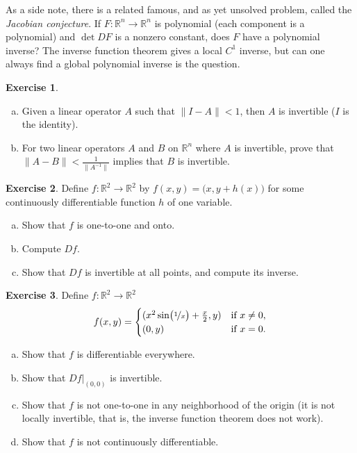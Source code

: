 \documentclass[12pt,openany]{book}
\newcommand{\snorm}[1]{\lVert {#1} \rVert}
\newcommand{\R}{{\mathbb{R}}}
\newcommand{\myindex}[1]{#1\index{#1}}
\theoremstyle{plain}
\theoremstyle{remark}
\theoremstyle{definition}
\newenvironment{exbox}{%
    \def\FrameCommand{\vrule width 1pt \relax\hspace {10pt}}%
    \MakeFramed {\advance \hsize -\width \FrameRestore }%
}{%
    \endMakeFramed
}
\newenvironment{exparts}{%
    \leavevmode\begin{enumerate}[a),noitemsep,topsep=0pt,parsep=0pt,partopsep=0pt]
}{%
    \end{enumerate}
}
\theoremstyle{exercise}
\newtheorem{exercise}{Exercise}[section]
\theoremstyle{example}
\begin{document}
\medskip

As a side note, there is a related famous, and as yet unsolved problem,
called the \emph{\myindex{Jacobian conjecture}}.  If $F \colon \R^n \to
\R^n$ is polynomial (each component is a polynomial) and $\det DF$ is a nonzero
constant, does $F$ have a polynomial inverse?
The inverse function theorem gives a local $C^1$ inverse, but can one always
find a global polynomial inverse is the question.

\begin{exbox}
\begin{exercise}
\begin{exparts}
\item
Given a linear operator $A$ such that
$\snorm{I-A} < 1$, then $A$ is invertible ($I$ is the identity).
\item
For two linear operators $A$ and $B$ on $\R^n$ where $A$ is invertible,
prove that $\snorm{A-B} < \frac{1}{\snorm{A^{-1}}}$ implies that $B$ is
invertible.
\end{exparts}
\end{exercise}

\begin{exercise}
Define $f \colon \R^2 \to \R^2$ by $f(x,y) =
\bigl(x,y+h(x)\bigr)$ for some continuously differentiable function $h$ of one
variable.
\begin{exparts}
\item
Show that $f$ is one-to-one and onto.
\item
Compute $Df$.
\item
Show that $Df$ is invertible at all points, and compute
its inverse.
\end{exparts}
\end{exercise}

\begin{exercise}
Define $f \colon \R^2 \to \R^2$
\begin{equation*}
f(x,y) =
\begin{cases}
(x^2 \sin \bigl(\nicefrac{1}{x}\bigr) + \frac{x}{2} , y ) & \text{if } x \not= 0, \\
(0,y)                                                     & \text{if } x=0.
\end{cases}
\end{equation*}
\begin{exparts}
\item
Show that $f$ is differentiable everywhere.
\item
Show that $Df|_{(0,0)}$ is invertible.
\item
Show that $f$ is not one-to-one in any neighborhood of the origin (it is
not locally invertible, that is, the inverse function theorem does not work).
\item
Show that $f$ is not continuously differentiable.
\end{exparts}
\end{exercise}


\end{exbox}
\end{document}

